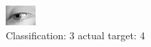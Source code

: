 \begin{figure}[h!]
\begin{center}
\includegraphics[width=0.60\columnwidth]{figures/ID2927_class_3_target_4.png}
\end{center}
\caption{ Classification: 3 actual target: 4}
\label{fig:ID2927_class_3_target_4}
\end{figure}
